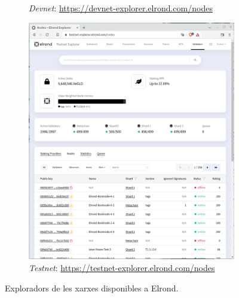 \documentclass[11pt,a4paper]{article}
\begin{document}
\begin{figure}[!htb]
\begin{subfigure}[b]{0.32\textwidth}
  \caption{\textit{Devnet}: \scriptsize\url{https://devnet-explorer.elrond.com/nodes}}\label{fig:devnet}
\end{subfigure}\hfill
\begin{subfigure}[b]{0.32\textwidth}
  \includegraphics[width=\linewidth]{testnet.png}
  \caption{\textit{Testnet}: \scriptsize\url{https://testnet-explorer.elrond.com/nodes}}\label{fig:testnet}
\end{subfigure}\hfill
\caption{Exploradors de les xarxes disponibles a Elrond.}\label{fig:nets}
\end{figure}
\end{document}
